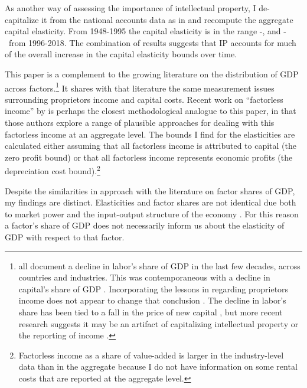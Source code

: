 \documentclass[11pt]{article}
\begin{document}
As another way of assessing the importance of intellectual property, I de-capitalize it from the national accounts data as in \cite{ksz2020} and recompute the aggregate capital elasticity. From 1948-1995 the capital elasticity is in the range \noipearlydepr-\noipearlynoprofit, and \noiplatedepr-\noiplatenoprofit \ from 1996-2018. The combination of results suggests that IP accounts for much of the overall increase in the capital elasticity bounds over time. 

This paper is a complement to the growing literature on the distribution of GDP across factors.\footnote{\cite{azmat2012,bentolilaSP2003,estrada2014,harrison2005,jt2007,guscina2006,kn2014,daoetal2017} all document a decline in labor's share of GDP in the last few decades, across countries and industries. This was contemporaneous with a decline in capital's share of GDP \citep{Barkai000,rognlie2015}. Incorporating the lessons in \cite{Gollin:2002zr} regarding proprietors income does not appear to change that conclusion \citep{gommerupert2004,elsbyhs2013}. The decline in labor's share has been tied to a fall in the price of new capital \citep{kn2014}, but more recent research suggests it may be an artifact of capitalizing intellectual property \citep{ksz2020} or the reporting of income \citep{RePEc:oup:qjecon:v:134:y:2019:i:4:p:1675-1745.}.} It shares with that literature the same measurement issues surrounding proprietors income and capital costs. Recent work on ``factorless income'' by \cite{kn2019} is perhaps the closest methodological analogue to this paper, in that those authors explore a range of plausible approaches for dealing with this factorless income at an aggregate level. The bounds I find for the elasticities are calculated either assuming that all factorless income is attributed to capital (the zero profit bound) or that all factorless income represents economic profits (the depreciation cost bound).\footnote{Factorless income as a share of value-added is larger in the industry-level data than in the aggregate because I do not have information on some rental costs that are reported at the aggregate level.} 

Despite the similarities in approach with the literature on factor shares of GDP, my findings are distinct. Elasticities and factor shares are not identical due both to market power and the input-output structure of the economy \citep{bfshortnote,bfprodge}. For this reason a factor's share of GDP does not necessarily inform us about the elasticity of GDP with respect to that factor.
\end{document}
